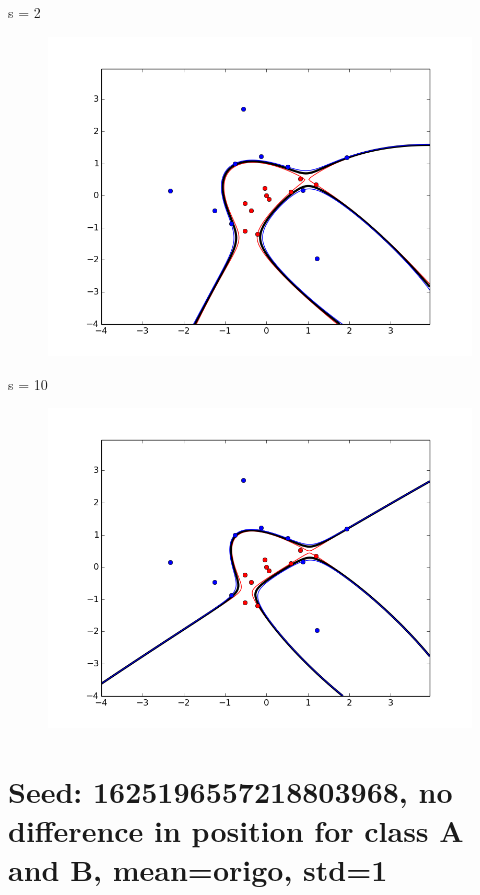 \documentclass{article}
\begin{document}
s = 2
\begin{figure}[H]
    \centering
    \includegraphics[width=1.0\linewidth]{../img/radial_s1_s2.png}
\end{figure}

s = 10
\begin{figure}[H]
    \centering
    \includegraphics[width=1.0\linewidth]{../img/radial_s1_s10.png}
\end{figure}

\section{Seed: 1625196557218803968, no difference in position for class A and B, mean=origo, std=1}
\end{document}
